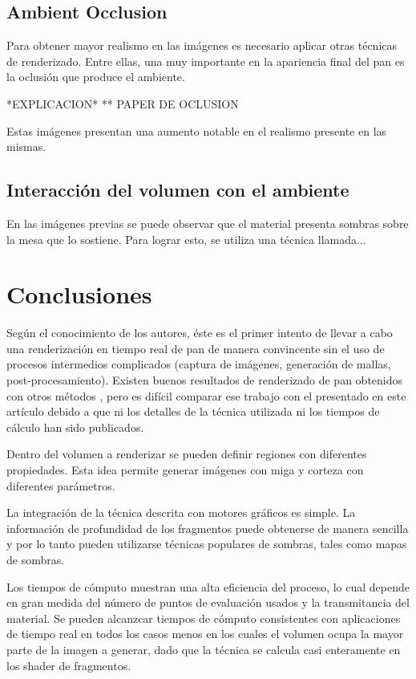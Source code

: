 \subsection{Ambient Occlusion}
Para obtener mayor realismo en las imágenes es necesario aplicar otras técnicas de renderizado. Entre ellas, una muy importante en la apariencia final del pan es la oclusión que produce el ambiente.

*EXPLICACION* 
** PAPER DE OCLUSION

Estas imágenes presentan una aumento notable en el realismo presente en las mismas.

\subsection{Interacción del volumen con el ambiente}
En las imágenes previas se puede observar que el material presenta sombras sobre la mesa que lo sostiene. Para lograr esto, se utiliza una técnica llamada...



\section{Conclusiones}

Según el conocimiento de los autores, éste es el primer intento de llevar a cabo una renderización en tiempo real de pan de manera convincente sin el uso de procesos intermedios complicados (captura de imágenes, generación de mallas, post-procesamiento). Existen buenos resultados de renderizado de pan obtenidos con otros métodos \cite{Cho2007}, pero es difícil comparar ese trabajo con el presentado en este artículo debido a que ni los detalles de la técnica utilizada ni los tiempos de cálculo han sido publicados.

Dentro del volumen a renderizar se pueden definir regiones con diferentes propiedades. Esta idea permite generar imágenes con miga y corteza con diferentes parámetros.

La integración de la técnica descrita con motores gráficos es simple. La información de profundidad de los fragmentos puede obtenerse de manera sencilla y por lo tanto pueden utilizarse técnicas populares de sombras, tales como mapas de sombras.

Los tiempos de cómputo muestran una alta eficiencia del proceso, lo cual depende en gran medida del número de puntos de evaluación usados y la transmitancia del material. Se pueden alcanzcar tiempos de cómputo consistentes con aplicaciones de tiempo real en todos los casos menos en los cuales el volumen ocupa la mayor parte de la imagen a generar, dado que la técnica se calcula casi enteramente en los shader de fragmentos. 

